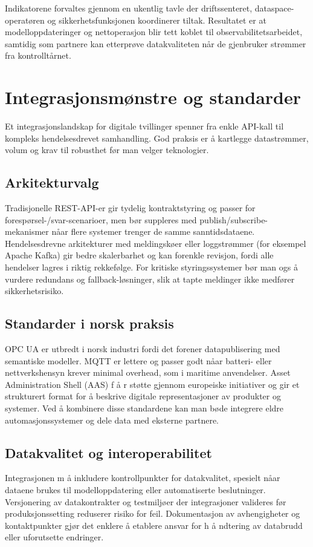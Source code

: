 Indikatorene forvaltes gjennom en ukentlig tavle der driftssenteret, dataspace-operatøren og sikkerhetsfunksjonen koordinerer tiltak. Resultatet er at modelloppdateringer og nettoperasjon blir tett koblet til observabilitetsarbeidet, samtidig som partnere kan etterprøve datakvaliteten når de gjenbruker strømmer fra kontrolltårnet.

\section{Integrasjonsmønstre og standarder}
Et integrasjonslandskap for digitale tvillinger spenner fra enkle API-kall til kompleks hendelsesdrevet samhandling. God praksis er  å kartlegge datastrømmer, volum og krav til robusthet før man velger teknologier.

\subsection{Arkitekturvalg}
Tradisjonelle REST-API-er gir tydelig kontraktstyring og passer for forespørsel-/svar-scenarioer, men bør suppleres med publish/subscribe-mekanismer nåar flere systemer trenger de samme sanntidsdataene. Hendelsesdrevne arkitekturer med meldingskøer eller loggstrømmer (for eksempel Apache Kafka) gir bedre skalerbarhet og kan forenkle revisjon, fordi alle hendelser lagres i riktig rekkefølge. For kritiske styringssystemer bør man ogs å vurdere redundans og fallback-løsninger, slik at tapte meldinger ikke medfører sikkerhetsrisiko.

\subsection{Standarder i norsk praksis}
OPC UA er utbredt i norsk industri fordi det forener datapublisering med semantiske modeller. MQTT er lettere og passer godt nåar batteri- eller nettverkshensyn krever minimal overhead, som i maritime anvendelser. Asset Administration Shell (AAS) f å r støtte gjennom europeiske initiativer og gir et strukturert format for  å beskrive digitale representasjoner av produkter og systemer. Ved  å kombinere disse standardene kan man bøde integrere eldre automasjonssystemer og dele data med eksterne partnere.

\subsection{Datakvalitet og interoperabilitet}
Integrasjonen m å inkludere kontrollpunkter for datakvalitet, spesielt nåar dataene brukes til modelloppdatering eller automatiserte beslutninger. Versjonering av datakontrakter og testmiljøer der integrasjoner valideres før produksjonssetting reduserer risiko for feil. Dokumentasjon av avhengigheter og kontaktpunkter gjør det enklere  å etablere ansvar for h å ndtering av databrudd eller uforutsette endringer.

